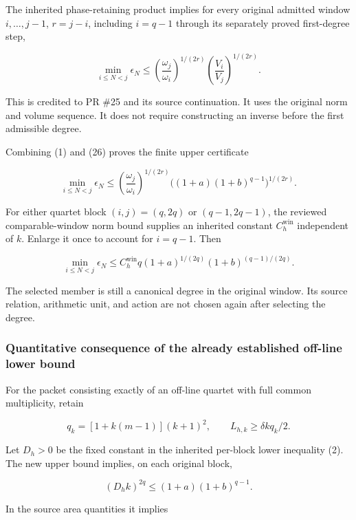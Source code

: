\documentclass[
  11pt,
]{article}
\begin{document}
The inherited phase-retaining product implies for every original
admitted window \(i,\ldots,j-1\), \(r=j-i\), including \(i=q-1\) through
its separately proved first-degree step,

\[
 \min_{i\le N<j}\epsilon_N
 \le\left(\frac{\omega_j}{\omega_i}\right)^{1/(2r)}
 \left(\frac{V_i}{V_j}\right)^{1/(2r)}.                         \tag{26}
\]

This is credited to PR \#25 and its source continuation. It uses the
original norm and volume sequence. It does not require constructing an
inverse before the first admissible degree.

Combining (1) and (26) proves the finite upper certificate

\[
 \boxed{
 \min_{i\le N<j}\epsilon_N
 \le\left(\frac{\omega_j}{\omega_i}\right)^{1/(2r)}
 \bigl((1+a)(1+b)^{q-1}\bigr)^{1/(2r)}.
 }                                                             \tag{27}
\]

For either quartet block \((i,j)=(q,2q)\) or \((q-1,2q-1)\), the
reviewed comparable-window norm bound supplies an inherited constant
\(C_h^{\mathrm{win}}\) independent of \(k\). Enlarge it once to account
for \(i=q-1\). Then

\[
 \boxed{
 \min_{i\le N<j}\epsilon_N
 \le C_h^{\mathrm{win}}q
 (1+a)^{1/(2q)}(1+b)^{(q-1)/(2q)}.
 }                                                             \tag{28}
\]

The selected member is still a canonical degree in the original window.
Its source relation, arithmetic unit, and action are not chosen again
after selecting the degree.

\subsubsection{Quantitative consequence of the already established
off-line lower
bound}\label{quantitative-consequence-of-the-already-established-off-line-lower-bound}

For the packet consisting exactly of an off-line quartet with full
common multiplicity, retain

\[
 q_k=[1+k(m-1)](k+1)^2,\qquad L_{h,k}\ge\delta kq_k/2.
\]

Let \(D_h>0\) be the fixed constant in the inherited per-block lower
inequality (2). The new upper bound implies, on each original block,

\[
 \boxed{(D_hk)^{2q}\le(1+a)(1+b)^{q-1}.}                        \tag{29}
\]

In the source area quantities it implies
\end{document}
